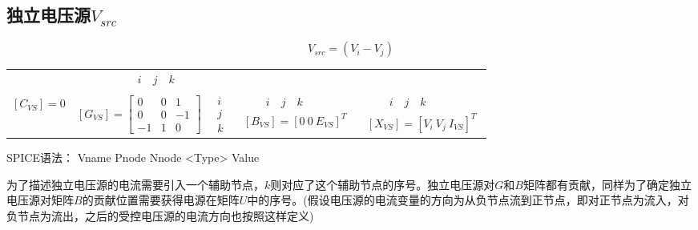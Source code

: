 \documentclass[12pt]{article}
\begin{document}
\subsection{独立电压源$V_{src}$}
\begin{equation*}
  V_{src}=\left(V_i - V_j\right)
\end{equation*}
\begin{table}[H]
  \centering\renewcommand{}
  \begin{tabular}{ccccc}
   & $ \qquad \quad i \quad j \quad k$ & & & \\                            \\
  $\left[C_{VS}\right]=0$ & 
  $\left[G_{VS}\right]=\left[\begin{array}{ccc} 0 & 0 & 1\\ 0 & 0 & -1\\ -1 & 1 & 0 \end{array}\right]$  & 
  $\begin{array}{c} i \\ j \\ k \end{array}$ &
  $\begin{array}{c} \qquad i \quad j \quad k \\ \left[B_{VS}\right]=\left[ 0 \ 0 \ E_{VS} \right]^T \end{array}$ & 
  $\begin{array}{c} \qquad i \quad j \quad k \\ \left[X_{VS}\right]=\left[ V_{i} \ V_{j} \ I_{VS} \right]^T \end{array}$ \\
  \end{tabular}
\end{table}
\qquad SPICE语法： Vname Pnode Nnode <Type> Value\par
\qquad 为了描述独立电压源的电流需要引入一个辅助节点，$k$则对应了这个辅助节点的序号。独立电压源对$G$和$B$矩阵都有贡献，同样为了确定独立电压源对矩阵$B$的贡献位置需要获得电源在矩阵$U$中的序号。(假设电压源的电流变量的方向为从负节点流到正节点，即对正节点为流入，对负节点为流出，之后的受控电压源的电流方向也按照这样定义)\par
\end{document}
